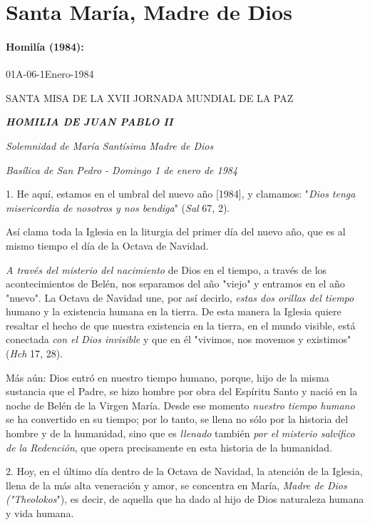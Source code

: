 \begin{body}
\begin{body}
\end{body} 

\chapter{Santa María, Madre de Dios}

\subsubsection{Homilía (1984): } 01A-06-1Enero-1984

SANTA MISA DE LA XVII JORNADA MUNDIAL DE LA PAZ

\emph{\textbf{HOMILIA DE JUAN PABLO II}}

\emph{Solemnidad de María Santísima Madre de Dios}

\emph{Basílica de San Pedro - Domingo 1 de enero de 1984}

1. He aquí, estamos en el umbral del nuevo año {[}1984{]}, y clamamos: "\emph{Dios tenga misericordia de nosotros y nos bendiga}" (\emph{Sal} 67, 2).

Así clama toda la Iglesia en la liturgia del primer día del nuevo año, que es al mismo tiempo el día de la Octava de Navidad.

\emph{A través del misterio del nacimiento} de Dios en el tiempo, a través de los acontecimientos de Belén, nos separamos del año "viejo" y entramos en el año "nuevo". La Octava de Navidad une, por así decirlo, \emph{estas dos orillas del tiempo} humano y la existencia humana en la tierra. De esta manera la Iglesia quiere resaltar el hecho de que nuestra existencia en la tierra, en el mundo visible, está conectada \emph{con el Dios invisible} y que en él "vivimos, nos movemos y existimos" (\emph{Hch} 17, 28).

Más aún: Dios entró en nuestro tiempo humano, porque, hijo de la misma sustancia que el Padre, se hizo hombre por obra del Espíritu Santo y nació en la noche de Belén de la Virgen María. Desde ese momento \emph{nuestro tiempo humano} se ha convertido en su tiempo; por lo tanto, se llena no sólo por la historia del hombre y de la humanidad, sino que es \emph{llenado} también \emph{por el misterio salvífico de la 	Redención}, que opera precisamente en esta historia de la humanidad.

2. Hoy, en el último día dentro de la Octava de Navidad, la atención de la Iglesia, llena de la más alta veneración y amor, se concentra en María, \emph{Madre de Dios ("Theolokos}"), es decir, de aquella que ha dado al hijo de Dios naturaleza humana y vida humana.


\end{body}
